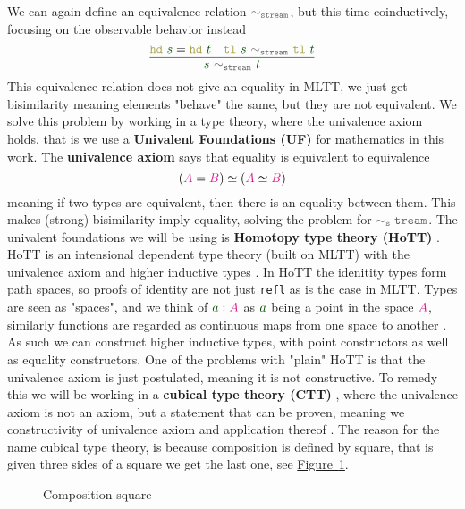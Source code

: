 \documentclass[twoside,11pt,openright]{report}
\theoremstyle{plain} %
\theoremstyle{definition}
\theoremstyle{remark}
\newcommand*{\figref}[1]{\hyperref[fig:#1]{Figure~\ref*{fig:#1}}}
\newcommand*{\term}[1]{\textcolor{green!30!black}{#1}} %
\newcommand*{\type}[1]{\textcolor{magenta!90!black}{#1}}
\newcommand*{\relation}[1]{\textcolor{gray!75!black}{\ensuremath{\mathtt{#1}}}}
\newcommand*{\destructor}[1]{\textcolor{yellow!60!black}{\ensuremath{\mathtt{#1}}}}
\newcommand{\ct}{%
  \mathchoice{\mathbin{\raisebox{0.5ex}{$\displaystyle\centerdot$}}}%
             {\mathbin{\raisebox{0.5ex}{$\centerdot$}}}%
             {\mathbin{\raisebox{0.25ex}{$\scriptstyle\,\centerdot\,$}}}%
             {\mathbin{\raisebox{0.1ex}{$\scriptscriptstyle\,\centerdot\,$}}}
}
\begin{document}
We can again define an equivalence relation \(\relation{\sim_{stream}}\), but this time coinductively, focusing on the observable behavior instead
\begin{equation}
  \label{eq:stream-bisimilarity}
  \vcenter{\infer{\term{s}~\relation{\sim_{stream}}~\term{t}}{\destructor{hd}~\term{s} = \destructor{hd}~\term{t} & \destructor{tl}~\term{s}~\relation{\sim_{stream}}~\destructor{tl}~\term{t}}}
\end{equation}
This equivalence relation does not give an equality in MLTT, we just get bisimilarity meaning elements "behave" the same, but they are not equivalent. We solve this problem by working in a type theory, where the univalence axiom holds, that is we use a \textbf{Univalent Foundations (UF)} for mathematics in this work. The \textbf{univalence axiom} says that equality is equivalent to equivalence
\begin{equation}
  (\type{A} = \type{B}) \simeq (\type{A} \simeq \type{B})
\end{equation}
meaning if two types are equivalent, then there is an equality between them. This makes (strong) bisimilarity imply equality, solving the problem for \(\relation{\sim_stream}\). The univalent foundations we will be using is \textbf{Homotopy type theory (HoTT)} \cite{hottbook}. HoTT is an intensional dependent type theory (built on MLTT) with the univalence axiom and higher inductive types . In HoTT the idenitity types form path spaces, so proofs of identity are not just \texttt{refl} as is the case in MLTT. Types are seen as "spaces", and we think of \(\term{a} : \type{A}\) as \(\term{a}\) being a point in the space \(\type{A}\), similarly functions are regarded as continuous maps from one space to another \cite{nlab:homotopy_type_theory}. As such we can construct higher inductive types, with point constructors as well as equality constructors. One of the problems with "plain" HoTT is that the univalence axiom is just postulated, meaning it is not constructive. To remedy this we will be working in a \textbf{cubical type theory (CTT)} \cite{DBLP:CTT}, where the univalence axiom is not an axiom, but a statement that can be proven, meaning we constructivity of univalence axiom and application thereof \cite{nlab:cubical_type_theory}.  The reason for the name cubical type theory, is because composition is defined by square, that is given three sides of a square we get the last one, see \figref{cubical-composition-square}.
\begin{figure}[h]
  \centering
  \caption{Composition square}
  \label{fig:cubical-composition-square}
\end{figure}
\end{document}
